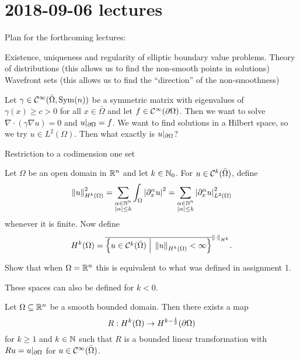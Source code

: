 \section{2018-09-06 lectures}

Plan for the forthcoming lectures:

\begin{itm}
  \io Existence, uniqueness and regularity of elliptic boundary value problems.
  \io Theory of distributions (this allows us to find the non-smooth points in solutions)
  \io Wavefront sets (this allows us to find the ``direction'' of the non-smoothness)
\end{itm}

Let $\gamma\in\mathcal{C}^\infty(\bar\Omega,\operatorname{Sym}(n))$ be a symmetric matrix with eigenvalues of $\gamma(x)\geq c>0$ for all $x\in\bar\Omega$ and let $f\in\mathcal{C}^\infty(\partial\Omega)$.
Then we want to solve $\nabla\cdot(\gamma\nabla u)=0$ and $u|_{\partial\Omega}=f$.
We want to find solutions in a Hilbert space, so we try $u\in L^2(\Omega)$.
Then what exactly is $u|_{\partial\Omega}$?

Restriction to a codimension one set

\begin{defn}
  Let $\Omega$ be an open domain in $\mathbb{R}^n$ and let $k\in\mathbb{N}_0$.
  For $u\in\mathcal{C}^k(\bar\Omega)$, define
  \[ \left\lVert u \right\rVert_{H^k(\Omega)}^2 = \sum_{\substack{\alpha\in\mathbb{N}^n\\\left\lvert \alpha \right\rvert\leq k}} \int_\Omega \left\lvert \partial_x^\alpha u \right\rvert^2 = \sum_{\substack{\alpha\in\mathbb{N}^n\\\left\lvert \alpha \right\rvert\leq k}} \left\lvert \partial_x^\alpha u \right\rvert_{L^2(\Omega)}^2 \]
  whenever it is finite.
  Now define
  \[ H^k(\Omega) = \overline{ \left\{ u\in\mathcal{C}^k(\bar\Omega) \; \Big\vert \; \left\lVert u \right\rVert_{H^k(\Omega)}<\infty \right\}}^{\left\lVert \cdot \right\rVert_{H^k}}. \]
\end{defn}

\begin{exer}
  Show that when $\Omega=\mathbb{R}^n$ this is equivalent to what was defined in assignment 1.
\end{exer}

\begin{rmk}
  These spaces can also be defined for $k<0$.
\end{rmk}

\begin{thm}\label{11:boundary}
  Let $\Omega\subseteq\mathbb{R}^n$ be a smooth bounded domain.
  Then there exists a map
  \[ R: H^k(\Omega) \to H^{k-\frac12}(\partial\Omega) \]
  for $k\geq 1$ and $k\in\mathbb{N}$ such that $R$ is a bounded linear transformation with $Ru=u|_{\partial\Omega}$ for $u\in\mathcal{C}^\infty(\bar\Omega)$.
\end{thm}

